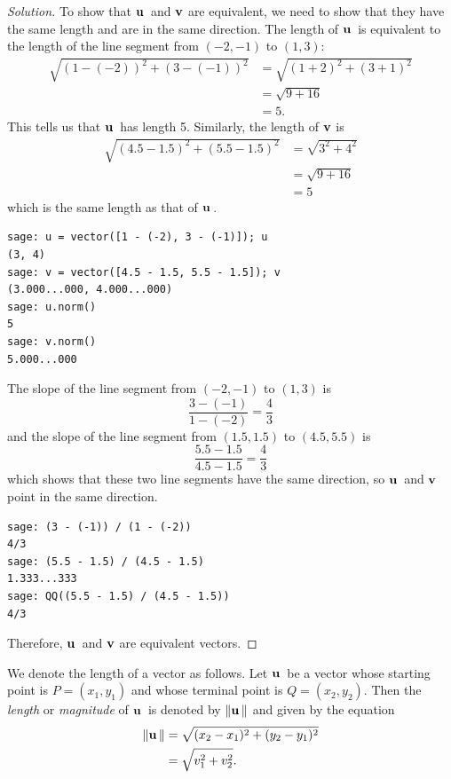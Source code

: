 \begin{proof}[Solution]
To show that $\operatorname*{\mathbf{u}}{}$ and $\operatorname*{\mathbf{v}}$ are equivalent, we need to show
that they have the same length and are in the same direction. The
length of $\operatorname*{\mathbf{u}}{}$ is equivalent to the length of the line segment
from $(-2,-1)$ to $(1,3)$:
%
\begin{align*}
\sqrt{(1 - (-2))^2 + (3 - (-1))^2}
&=
\sqrt{(1 + 2)^2 + (3 + 1)^2} \\
&=
\sqrt{9 + 16} \\
&=
5.
\end{align*}
%
This tells us that $\operatorname*{\mathbf{u}}{}$ has length 5. Similarly, the length of
$\operatorname*{\mathbf{v}}$ is
%
\begin{align*}
\sqrt{(4.5 - 1.5)^2 + (5.5 - 1.5)^2}
&=
\sqrt{3^2 + 4^2} \\
&=
\sqrt{9 + 16} \\
&=
5
\end{align*}
%
which is the same length as that of $\operatorname*{\mathbf{u}}{}$.

\begin{lstlisting}
sage: u = vector([1 - (-2), 3 - (-1)]); u
(3, 4)
sage: v = vector([4.5 - 1.5, 5.5 - 1.5]); v
(3.000...000, 4.000...000)
sage: u.norm()
5
sage: v.norm()
5.000...000
\end{lstlisting}

The slope of the line segment from
$(-2,-1)$ to $(1,3)$ is
\[
\frac{3 - (-1)} {1 - (-2)}
=
\frac{4}{3}
\]
and the slope of the line segment from $(1.5,1.5)$ to $(4.5,5.5)$ is
\[
\frac{5.5 - 1.5}{4.5 - 1.5}
=
\frac{4}{3}
\]
which shows that these two line segments have the same direction, so
$\operatorname*{\mathbf{u}}{}$ and $\operatorname*{\mathbf{v}}$ point in the same direction.
%
\begin{lstlisting}
sage: (3 - (-1)) / (1 - (-2))
4/3
sage: (5.5 - 1.5) / (4.5 - 1.5)
1.333...333
sage: QQ((5.5 - 1.5) / (4.5 - 1.5))
4/3
\end{lstlisting}
%
Therefore, $\operatorname*{\mathbf{u}}{}$ and $\operatorname*{\mathbf{v}}$ are equivalent vectors.
\end{proof}

We denote the length of a vector as
follows. Let $\operatorname*{\mathbf{u}}{}$ be a vector whose starting point is
$P = (x_1, y_1)$ and whose terminal point is $Q = (x_2, y_2)$. Then
the \emph{length} or
\emph{magnitude} of $\operatorname*{\mathbf{u}}{}$
is denoted by $\left\Arrowvert \operatorname*{\mathbf{u}}{} \right\Arrowvert$ and given by the equation
%
\begin{equation}
\label{eq:vectors_matrices:magnitude_two_dimensional_vector}
\begin{aligned}
\left\Arrowvert \operatorname*{\mathbf{u}}{} \right\Arrowvert
&=
\sqrt{(x_2 - x_1)^2 + (y_2 - y_1)^2} \\
&=
\sqrt{v_1^2 + v_2^2}.
\end{aligned}
\end{equation}


